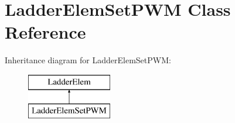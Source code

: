 \hypertarget{class_ladder_elem_set_p_w_m}{\section{Ladder\-Elem\-Set\-P\-W\-M Class Reference}
\label{class_ladder_elem_set_p_w_m}
}
Inheritance diagram for Ladder\-Elem\-Set\-P\-W\-M\-:\begin{figure}[H]
\begin{center}
\leavevmode
\includegraphics[height=2.000000cm]{class_ladder_elem_set_p_w_m}
\end{center}
\end{figure}
